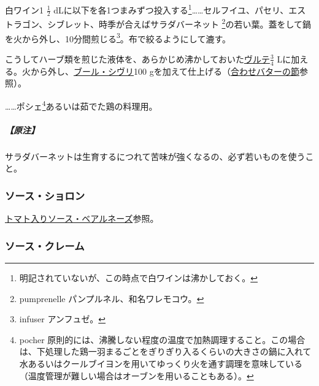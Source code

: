 \begin{recette}


白ワイン1 \(\frac{1}{2}\) dLに以下を各1つまみずつ投入する\footnote{明記されていないが、この時点で白ワインは沸かしておく。}\ldots{}\ldots{}セルフイユ、パセリ、エストラゴン、シブレット、時季が合えばサラダバーネット
\footnote{pumprenelle パンプルネル、和名ワレモコウ。}の若い葉。蓋をして鍋を火から外し、10分間煎じる\footnote{infuser
  アンフュゼ。}。布で絞るようにして漉す。

こうしてハーブ類を煎じた液体を、あらかじめ沸かしておいた\protect\hyperlink{veloute}{ヴルテ}\(\frac{3}{4}\)
Lに加える。火から外し、\protect\hyperlink{beurre-chivry}{ブール・シヴリ}100
gを加えて仕上げる（\protect\hyperlink{beurres-composes}{合わせバターの節}参照）。

\ldots{}\ldots{}ポシェ\footnote{pocher
  原則的には、沸騰しない程度の温度で加熱調理すること。この場合は、下処理した鶏一羽まるごとをぎりぎり入るくらいの大きさの鍋に入れて水あるいはクールブイヨンを用いてゆっくり火を通す調理を意味している（温度管理が難しい場合はオーブンを用いることもある）。}あるいは茹でた鶏の料理用。

\hypertarget{nota-sauce-chivry}{%
\subparagraph{【原注】}\label{nota-sauce-chivry}}

サラダバーネットは生育するにつれて苦味が強くなるの、必ず若いものを使うこと。

\hypertarget{sauce-choron}{%
\subsubsection{ソース・ショロン}\label{sauce-choron}}


\protect\hyperlink{sauce-bearnaise-tomatee}{トマト入りソース・ベアルネーズ}参照。

\hypertarget{sauce-creme}{%
\subsubsection{ソース・クレーム}\label{sauce-creme}}




\end{recette}
